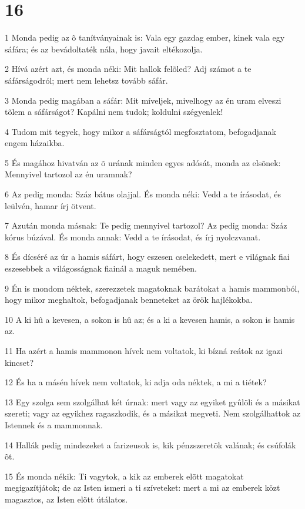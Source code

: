 \chapter{16}

\par 1 Monda pedig az õ tanítványainak is: Vala egy gazdag ember, kinek vala egy sáfára; és az bevádoltaték nála, hogy javait eltékozolja.
\par 2 Hívá azért azt, és monda néki: Mit hallok felõled? Adj számot a te sáfárságodról; mert nem lehetsz tovább sáfár.
\par 3 Monda pedig magában a sáfár: Mit míveljek, mivelhogy az én uram elveszi tõlem a sáfárságot? Kapálni nem tudok; koldulni szégyenlek!
\par 4 Tudom mit tegyek, hogy mikor a sáfárságtól megfosztatom, befogadjanak engem házaikba.
\par 5 És magához hivatván az õ urának minden egyes adósát, monda az elsõnek: Mennyivel tartozol az én uramnak?
\par 6 Az pedig monda: Száz bátus olajjal. És monda néki: Vedd a te írásodat, és leülvén, hamar írj ötvent.
\par 7 Azután monda másnak: Te pedig mennyivel tartozol? Az pedig monda: Száz kórus búzával. És monda annak: Vedd a te írásodat, és írj nyolczvanat.
\par 8 És dícséré az úr a hamis sáfárt, hogy eszesen cselekedett, mert e világnak fiai eszesebbek a világosságnak fiainál a maguk nemében.
\par 9 Én is mondom néktek, szerezzetek magatoknak barátokat a hamis mammonból, hogy mikor meghaltok, befogadjanak benneteket az örök hajlékokba.
\par 10 A ki hû a kevesen, a sokon is hû az; és a ki a kevesen hamis, a sokon is hamis az.
\par 11 Ha azért a hamis mammonon hívek nem voltatok, ki bízná reátok az igazi kincset?
\par 12 És ha a másén hívek nem voltatok, ki adja oda néktek, a mi a tiétek?
\par 13 Egy szolga sem szolgálhat két úrnak: mert vagy az egyiket gyûlöli és a másikat szereti; vagy az egyikhez ragaszkodik, és a másikat megveti. Nem szolgálhattok az Istennek és a mammonnak.
\par 14 Hallák pedig mindezeket a farizeusok is, kik pénzszeretõk valának; és csúfolák õt.
\par 15 És monda nékik: Ti vagytok, a kik az emberek elõtt magatokat megigazítjátok; de az Isten ismeri a  ti szíveteket: mert a mi az emberek közt magasztos, az Isten elõtt útálatos.

